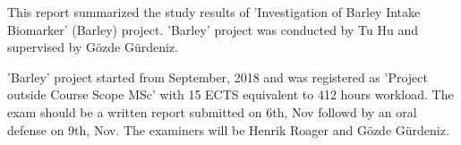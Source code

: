 This report summarized the study results of 'Investigation of Barley Intake Biomarker' (Barley)
project. 'Barley' project was conducted by Tu Hu and supervised by Gözde Gürdeniz. 

'Barley' project started from September, 2018 and was registered as 'Project outside Course Scope MSc' with 15 ECTS equivalent to 412 hours workload. The exam should be a written report submitted on 6th, Nov followd by an oral defense on 9th, Nov. The examiners will be Henrik Roager and Gözde Gürdeniz.